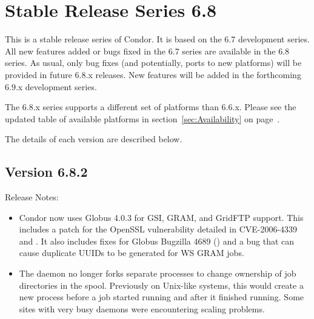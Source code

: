 \section{\label{sec:History-6-8}Stable Release Series 6.8}

This is a stable release series of Condor.
It is based on the 6.7 development series.
All new features added or bugs fixed in the 6.7 series are available
in the 6.8 series.
As usual, only bug fixes (and potentially, ports to new platforms)
will be provided in future 6.8.x releases.
New features will be added in the forthcoming 6.9.x development series.


The 6.8.x series supports a different set of platforms than 6.6.x.
Please see the updated table of available platforms in
section~\ref{sec:Availability} on page~\pageref{sec:Availability}.

The details of each version are described below.


\subsection*{\label{sec:New-6-8-2}Version 6.8.2}

\noindent Release Notes:

\begin{itemize}

\item Condor now uses Globus 4.0.3 for GSI, GRAM, and GridFTP support.
This includes a patch for the OpenSSL vulnerability detailed in 
CVE-2006-4339 and .
It also includes fixes for Globus Bugzilla 4689 
() and a 
bug that can cause duplicate UUIDs to be generated for WS GRAM jobs.

\item The  daemon no longer forks separate processes to 
change ownership of job directories in the spool.
Previously on Unix-like systems, this would create a
new process before a job started running and after it finished running.   Some
sites with very busy  daemons were encountering scaling problems.

\end{itemize}


